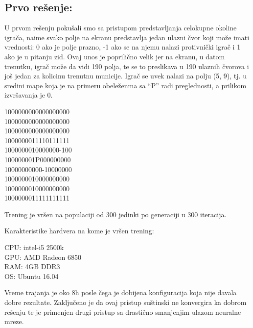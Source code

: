 \documentclass[a4paper]{article}
\begin{document}
\subsection {Prvo rešenje:}
\par U prvom rešenju pokušali smo sa pristupom predstavljanja celokupne okoline igrača, naime svako polje na ekranu predstavlja jedan ulazni čvor koji može imati vrednosti: 0 ako je polje prazno, -1 ako se na njemu nalazi protivnički igrač i 1 ako je u pitanju zid. Ovaj unos je poprilično velik jer na ekranu, u datom trenutku, igrač može da vidi 190 polja, te se to preslikava u 190 ulaznih čvorova i još jedan za kolicinu trenutnu municije.  Igrač se uvek nalazi na polju (5, 9), tj. u sredini mape koja je na primeru obeleženma sa  “P” radi preglednosti, a prilikom izvršavanja je 0.  
\newline
\begin{tcolorbox}
\begin {center}
1000000000000000000 \\
1000000000000000000\\
1000000000000000000\\
1000000011110111111\\
1000000010000000-100\\
100000001P000000000\\
10000000000-10000000\\
1000000010000000000\\
1000000010000000000\\
1000000011111111111\\
\end{center}
\end{tcolorbox}

Trening je vršen na populaciji od 300 jedinki po generaciji u 300 iteracija.
\newline
\begin{tcolorbox}
\begin {center}
Karakteristike hardvera na kome je vršen trening: \\
\end {center}
CPU: intel-i5 2500k \\
GPU: AMD Radeon 6850 \\
RAM: 4GB DDR3 \\
OS: Ubuntu 16.04 \\
\end{tcolorbox}
\noindent Vreme trajanja je oko 8h posle čega je dobijena konfiguracija koja nije davala dobre rezultate. Zaključeno je da ovaj pristup suštinski ne konvergira ka dobrom rešenju te je primenjen drugi pristup sa drastično smanjenjim ulazom neuralne mreze.
\end{document}
